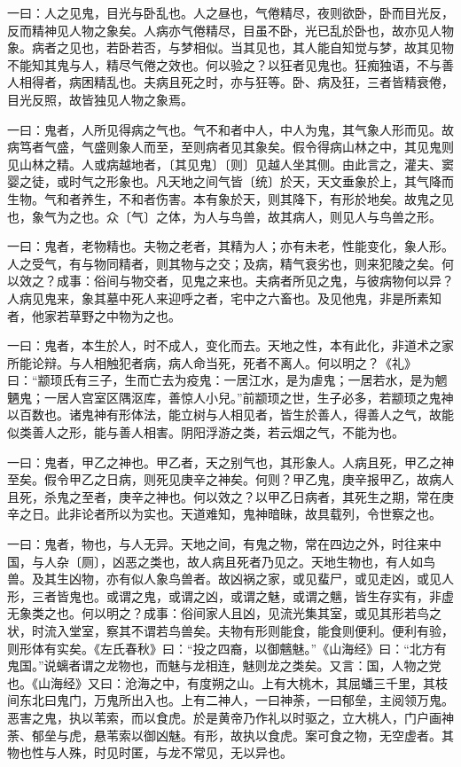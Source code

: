 \documentclass[]{article}
\begin{document}
一曰：人之见鬼，目光与卧乱也。人之昼也，气倦精尽，夜则欲卧，卧而目光反，反而精神见人物之象矣。人病亦气倦精尽，目虽不卧，光已乱於卧也，故亦见人物象。病者之见也，若卧若否，与梦相似。当其见也，其人能自知觉与梦，故其见物不能知其鬼与人，精尽气倦之效也。何以验之？以狂者见鬼也。狂痴独语，不与善人相得者，病困精乱也。夫病且死之时，亦与狂等。卧、病及狂，三者皆精衰倦，目光反照，故皆独见人物之象焉。

一曰：鬼者，人所见得病之气也。气不和者中人，中人为鬼，其气象人形而见。故病笃者气盛，气盛则象人而至，至则病者见其象矣。假令得病山林之中，其见鬼则见山林之精。人或病越地者，〔其见鬼〕〔则〕见越人坐其侧。由此言之，灌夫、窦婴之徒，或时气之形象也。凡天地之间气皆〔统〕於天，天文垂象於上，其气降而生物。气和者养生，不和者伤害。本有象於天，则其降下，有形於地矣。故鬼之见也，象气为之也。众〔气〕之体，为人与鸟兽，故其病人，则见人与鸟兽之形。

一曰：鬼者，老物精也。夫物之老者，其精为人；亦有未老，性能变化，象人形。人之受气，有与物同精者，则其物与之交；及病，精气衰劣也，则来犯陵之矣。何以效之？成事：俗间与物交者，见鬼之来也。夫病者所见之鬼，与彼病物何以异？人病见鬼来，象其墓中死人来迎呼之者，宅中之六畜也。及见他鬼，非是所素知者，他家若草野之中物为之也。

一曰：鬼者，本生於人，时不成人，变化而去。天地之性，本有此化，非道术之家所能论辩。与人相触犯者病，病人命当死，死者不离人。何以明之？《礼》曰：``颛顼氏有三子，生而亡去为疫鬼：一居江水，是为虐鬼；一居若水，是为魍魉鬼；一居人宫室区隅沤库，善惊人小兒。''前颛顼之世，生子必多，若颛顼之鬼神以百数也。诸鬼神有形体法，能立树与人相见者，皆生於善人，得善人之气，故能似类善人之形，能与善人相害。阴阳浮游之类，若云烟之气，不能为也。

一曰：鬼者，甲乙之神也。甲乙者，天之别气也，其形象人。人病且死，甲乙之神至矣。假令甲乙之日病，则死见庚辛之神矣。何则？甲乙鬼，庚辛报甲乙，故病人且死，杀鬼之至者，庚辛之神也。何以效之？以甲乙日病者，其死生之期，常在庚辛之日。此非论者所以为实也。天道难知，鬼神暗昧，故具载列，令世察之也。

一曰：鬼者，物也，与人无异。天地之间，有鬼之物，常在四边之外，时往来中国，与人杂〔厕〕，凶恶之类也，故人病且死者乃见之。天地生物也，有人如鸟兽。及其生凶物，亦有似人象鸟兽者。故凶祸之家，或见蜚尸，或见走凶，或见人形，三者皆鬼也。或谓之鬼，或谓之凶，或谓之魅，或谓之魑，皆生存实有，非虚无象类之也。何以明之？成事：俗间家人且凶，见流光集其室，或见其形若鸟之状，时流入堂室，察其不谓若鸟兽矣。夫物有形则能食，能食则便利。便利有验，则形体有实矣。《左氏春秋》曰：``投之四裔，以御魑魅。''《山海经》曰：``北方有鬼国。''说螭者谓之龙物也，而魅与龙相连，魅则龙之类矣。又言：国，人物之党也。《山海经》又曰：沧海之中，有度朔之山。上有大桃木，其屈蟠三千里，其枝间东北曰鬼门，万鬼所出入也。上有二神人，一曰神荼，一曰郁垒，主阅领万鬼。恶害之鬼，执以苇索，而以食虎。於是黄帝乃作礼以时驱之，立大桃人，门户画神荼、郁垒与虎，悬苇索以御凶魅。有形，故执以食虎。案可食之物，无空虚者。其物也性与人殊，时见时匿，与龙不常见，无以异也。
\end{document}
